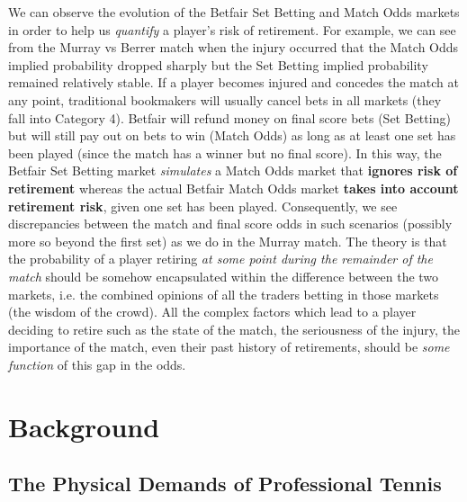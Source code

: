 \documentclass[authoryear, 12pt]{elsarticle}
\begin{document}
We can observe the evolution of the Betfair Set Betting and Match Odds markets in order to help us \textit{quantify} a player's risk of retirement.  For example, we can see from the Murray vs Berrer match when the injury occurred that the Match Odds implied probability dropped sharply but the Set Betting implied probability remained relatively stable.  If a player becomes injured and concedes the match at any point, traditional bookmakers will usually cancel bets in all markets (they fall into Category 4).  Betfair will refund money on final score bets (Set Betting) but will still pay out on bets to win (Match Odds) as long as at least one set has been played (since the match has a winner but no final score).  In this way, the Betfair Set Betting market \textit{simulates} a Match Odds market that \textbf{ignores risk of retirement} whereas the actual Betfair Match Odds market \textbf{takes into account retirement risk}, given one set has been played.  Consequently, we see discrepancies between the match and final score odds in such scenarios (possibly more so beyond the first set) as we do in the Murray match.  
The theory is that the probability of a player retiring \textit{at some point during the remainder of the match} should be somehow encapsulated within the difference between the two markets, i.e. the combined opinions of all the traders betting in those markets (the wisdom of the crowd).  All the complex factors which lead to a player deciding to retire such as the state of the match, the seriousness of the injury, the importance of the match, even their past history of retirements, should be \textit{some function} of this gap in the odds.

\section{Background}

\subsection{The Physical Demands of Professional Tennis}
\end{document}
